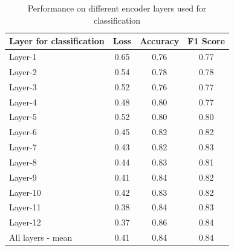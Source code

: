 \documentclass[../main.tex]{subfiles}
\begin{document}
\begin{table}
  \caption{Performance on different encoder layers used for classification}
  \label{tab:layer4clas}
  \begin{tabular}{lccc}
    \toprule
    Layer for classification  &  Loss &  Accuracy &  F1 Score\\
    \midrule
    Layer-1 &      0.65 & 0.76 & 0.77 \\
    Layer-2 &      0.54 & 0.78 & 0.78 \\
    Layer-3 &      0.52 & 0.76 & 0.77 \\
    Layer-4 &      0.48 & 0.80 & 0.77 \\
    Layer-5 &      0.52 & 0.80 & 0.80 \\
    Layer-6 &      0.45 & 0.82 & 0.82 \\
    Layer-7 &      0.43 & 0.82 & 0.83 \\
    Layer-8 &      0.44 & 0.83 & 0.81 \\
    Layer-9 &      0.41 & 0.84 & 0.82 \\
    Layer-10 &      0.42 & 0.83 & 0.82 \\
    Layer-11 &      0.38 & 0.84 & 0.83 \\
    Layer-12 &      0.37 & 0.86 & 0.84 \\
    \midrule
    All layers - mean  &      0.41 & 0.84 & 0.84 \\
  \bottomrule
\end{tabular}
\end{table}
\end{document}
